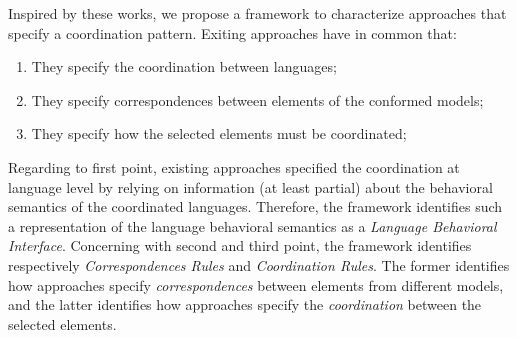 Inspired by these works, we propose a framework to characterize approaches that specify a coordination pattern. Exiting approaches have in common that:
\begin{enumerate}
	\item They specify the coordination between languages;
	
	\item They specify correspondences between elements of the conformed models;
	
	\item They specify how the selected elements must be coordinated;
	   
\end{enumerate}	
Regarding to first point, existing approaches specified the coordination at language level by relying on information (at least partial) about the behavioral semantics of the coordinated languages. Therefore, the framework identifies such a representation of the language behavioral semantics as a \emph{Language Behavioral Interface}. Concerning with second and third point, the framework identifies respectively \emph{Correspondences Rules} and \emph{Coordination Rules}. The former identifies how approaches specify \emph{correspondences} between elements from different models, and the latter identifies how approaches specify the \emph{coordination} between the selected elements.

